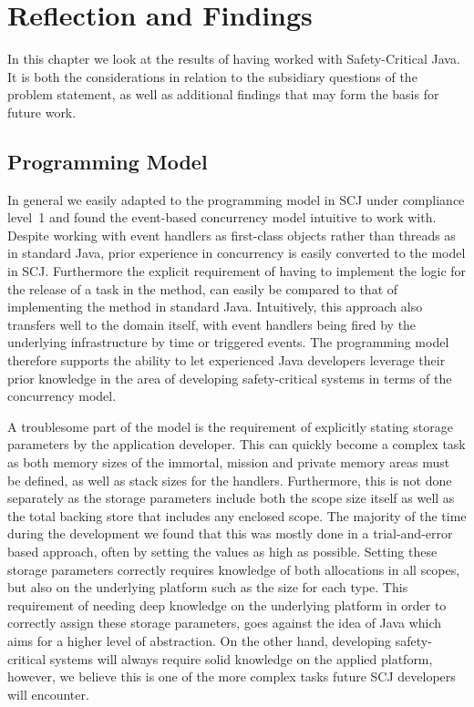 \chapter{Reflection and Findings}
\label{chapter:Reflection}
In this chapter we look at the results of having worked with Safety-Critical Java. It is both the considerations in relation to the subsidiary questions of the problem statement, as well as additional findings that may form the basis for future work.

\section{Programming Model} 
\label{sec:programming_model}
In general we easily adapted to the programming model in SCJ under compliance level~1 and found the event-based concurrency model intuitive to work with. Despite working with event handlers as first-class objects rather than threads as in standard Java, prior experience in concurrency is easily converted to the model in SCJ. Furthermore the explicit requirement of having to implement the logic for the release of a task in the  method, can easily be compared to that of implementing the  method in standard Java. Intuitively, this approach also transfers well to the domain itself, with event handlers being fired by the underlying infrastructure by time or triggered events. The programming model therefore supports the ability to let experienced Java developers leverage their prior knowledge in the area of developing safety-critical systems in terms of the concurrency model.

A troublesome part of the model is the requirement of explicitly stating storage parameters by the application developer. This can quickly become a complex task as both memory sizes of the immortal, mission and private memory areas must be defined, as well as stack sizes for the handlers. Furthermore, this is not done separately as the storage parameters include both the scope size itself as well as the total backing store that includes any enclosed scope. The majority of the time during the development we found that this was mostly done in a trial-and-error based approach, often by setting the values as high as possible. Setting these storage parameters correctly requires knowledge of both allocations in all scopes, but also on the underlying platform such as the size for each type. This requirement of needing deep knowledge on the underlying platform in order to correctly assign these storage parameters, goes against the idea of Java which aims for a higher level of abstraction. On the other hand, developing safety-critical systems will always require solid knowledge on the applied platform, however, we believe this is one of the more complex tasks future SCJ developers will encounter.

